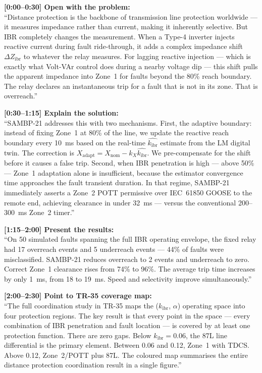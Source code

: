 \documentclass[12pt,a4paper]{article}
\newcommand{\kibr}{k_\mathrm{ibr}}
\newcommand{\DZibr}{\Delta Z_\mathrm{ibr}}
\begin{document}
\begin{speakbox}
\textbf{[0:00--0:30] Open with the problem:}\\
``Distance protection is the backbone of transmission line protection worldwide --- it measures impedance rather than current, making it inherently selective. But IBR completely changes the measurement. When a Type-4 inverter injects reactive current during fault ride-through, it adds a complex impedance shift $\DZibr$ to whatever the relay measures. For lagging reactive injection --- which is exactly what Volt-VAr control does during a nearby voltage dip --- this shift pulls the apparent impedance into Zone~1 for faults beyond the 80\% reach boundary. The relay declares an instantaneous trip for a fault that is not in its zone. That is overreach.''

\textbf{[0:30--1:15] Explain the solution:}\\
``SAMBP-21 addresses this with two mechanisms. First, the adaptive boundary: instead of fixing Zone~1 at 80\% of the line, we update the reactive reach boundary every 10~ms based on the real-time $\hat{\kibr}$ estimate from the LM digital twin. The correction is $X_\mathrm{adapt} = X_\mathrm{nom} - k_X \hat{\kibr}$. We pre-compensate for the shift before it causes a false trip. Second, when IBR penetration is high --- above 50\% --- Zone~1 adaptation alone is insufficient, because the estimator convergence time approaches the fault transient duration. In that regime, SAMBP-21 immediately asserts a Zone~2 POTT permissive over IEC~61850 GOOSE to the remote end, achieving clearance in under 32~ms --- versus the conventional 200--300~ms Zone~2 timer.''

\textbf{[1:15--2:00] Present the results:}\\
``On 50 simulated faults spanning the full IBR operating envelope, the fixed relay had 17 overreach events and 5 underreach events --- 44\% of faults were misclassified. SAMBP-21 reduces overreach to 2 events and underreach to zero. Correct Zone~1 clearance rises from 74\% to 96\%. The average trip time increases by only 1~ms, from 18 to 19~ms. Speed and selectivity improve simultaneously.''

\textbf{[2:00--2:30] Point to TR-35 coverage map:}\\
``The full coordination study in TR-35 maps the ($\kibr$, $\alpha$) operating space into four protection regions. The key result is that every point in the space --- every combination of IBR penetration and fault location --- is covered by at least one protection function. There are zero gaps. Below $\kibr = 0.06$, the 87L line differential is the primary element. Between 0.06 and 0.12, Zone~1 with TDCS. Above 0.12, Zone~2/POTT plus 87L. The coloured map summarises the entire distance protection coordination result in a single figure.''


\end{speakbox}
\end{document}
